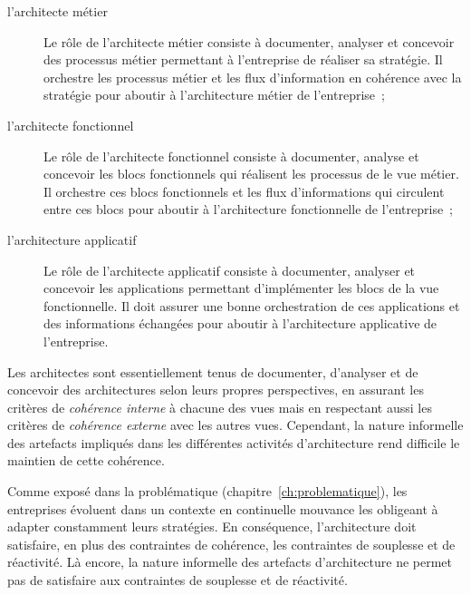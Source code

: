 \begin{description}

    \item[l'architecte métier]

    Le rôle de l'architecte métier consiste à documenter, analyser et concevoir
    des processus métier permettant à l'entreprise de réaliser sa stratégie.
    Il orchestre les processus métier et les flux d'information en cohérence
    avec la stratégie pour aboutir à l'architecture métier de l'entreprise~;

    \item[l'architecte fonctionnel]

    Le rôle de l'architecte fonctionnel consiste à documenter, analyse et
    concevoir les blocs fonctionnels qui réalisent les processus de
    le vue métier. Il orchestre ces blocs fonctionnels et les flux d'informations
    qui circulent entre ces blocs pour aboutir à l'architecture fonctionnelle
    de l'entreprise~;

    \item[l'architecture applicatif]

    Le rôle de l'architecte applicatif consiste à documenter, analyser
    et concevoir les applications permettant d'implémenter les blocs
    de la vue fonctionnelle. Il doit assurer une bonne orchestration de ces
    applications et des informations échangées pour aboutir à l'architecture
    applicative de l'entreprise.

\end{description}

Les architectes sont essentiellement tenus de documenter,
d'analyser et de concevoir des architectures selon leurs propres perspectives,
en assurant les critères de \emph{cohérence interne} à chacune des vues mais
en respectant aussi les critères de \emph{cohérence externe} avec les autres
vues. Cependant, la nature informelle des artefacts impliqués dans les différentes
activités d’architecture rend difficile le maintien de cette cohérence.

Comme exposé dans la problématique (chapitre~\ref{ch:problematique}), les entreprises
évoluent dans un contexte en continuelle mouvance les obligeant à adapter
constamment leurs stratégies. En conséquence, l'architecture doit satisfaire,
en plus des contraintes de cohérence, les contraintes de souplesse et de réactivité.
Là encore, la nature informelle des artefacts d’architecture ne permet pas
de satisfaire aux contraintes de souplesse et de réactivité.


